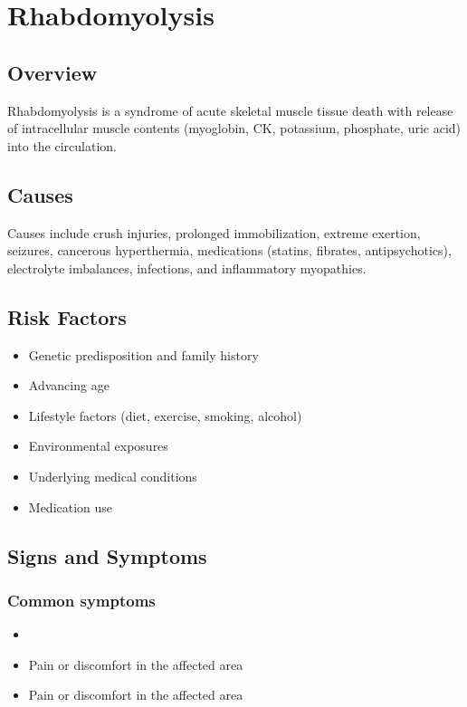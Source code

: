 \chapter{Rhabdomyolysis}
\label{sec:Rhabdomyolysis}

\section{Overview}
Rhabdomyolysis is a syndrome of acute skeletal muscle tissue death with release of intracellular muscle contents (myoglobin, CK, potassium, phosphate, uric acid) into the circulation.
\section{Causes}
Causes include crush injuries, prolonged immobilization, extreme exertion, seizures, cancerous hyperthermia, medications (statins, fibrates, antipsychotics), electrolyte imbalances, infections, and inflammatory myopathies.     
\section{Risk Factors}

\begin{itemize}[noitemsep]
  \item Genetic predisposition and family history
  \item Advancing age
  \item Lifestyle factors (diet, exercise, smoking, alcohol)
  \item Environmental exposures
  \item Underlying medical conditions
  \item Medication use
\end{itemize}
\section{Signs and Symptoms}

\subsection{Common symptoms}
\begin{itemize}[noitemsep]
  \item \item Pain or discomfort in the affected area    \item Pain or discomfort in the affected area
  \end{itemize}

